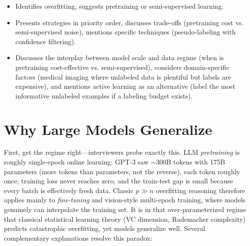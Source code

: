 \begin{interviewq}
\goodgreat
\begin{itemize}
    \item {} Identifies overfitting, suggests pretraining or semi-supervised learning.
    \item {} Presents strategies in priority order, discusses trade-offs (pretraining cost vs. semi-supervised noise), mentions specific techniques (pseudo-labeling with confidence filtering).
    \item {} Discusses the interplay between model scale and data regime (when is pretraining cost-effective vs. semi-supervised), considers domain-specific factors (medical imaging where unlabeled data is plentiful but labels are expensive), and mentions active learning as an alternative (label the most informative unlabeled examples if a labeling budget exists).
\end{itemize}

\end{interviewq}

\section{Why Large Models Generalize}
\label{sec:why_large_generalize}

First, get the regime right---interviewers probe exactly this. LLM \textit{pretraining} is roughly single-epoch online learning: GPT-3 saw $\sim$300B tokens with 175B parameters (more tokens than parameters, not the reverse), each token roughly once; training loss never reaches zero, and the train-test gap is small because every batch is effectively fresh data. Classic $p \gg n$ overfitting reasoning therefore applies mainly to \textit{fine-tuning} and vision-style multi-epoch training, where models genuinely can interpolate the training set. It is in that over-parameterized regime that classical statistical learning theory (VC dimension, Rademacher complexity) predicts catastrophic overfitting, yet models generalize well. Several complementary explanations resolve this paradox:

